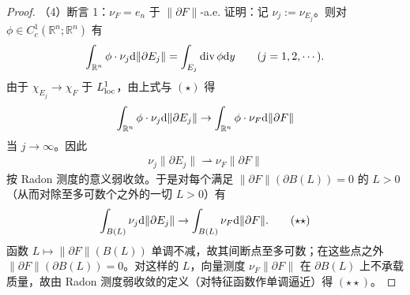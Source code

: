 \documentclass[../../main.tex]{subfiles}%
\begin{document}
\begin{proof}
（4）断言 1：$\nu_F=e_n$ 于 $\lVert\partial F\rVert$-a.e.
证明：记 $\nu_j:=\nu_{E_j}$。则对 $\phi\in C_c^1(\mathbb{R}^n;\mathbb{R}^n)$ 有
\begin{align*}
\int_{\mathbb{R}^n}\phi\cdot\nu_j\mathrm{d}\lVert\partial E_j\rVert=\int_{E_j}\operatorname{div}\phi\mathrm{d} y\qquad(j=1,2,\cdots).
\end{align*}
由于 $\chi_{E_j}\to\chi_F$ 于 $L^1_{\mathrm{loc}}$，由上式与 $(\star)$ 得
\begin{align*}
\int_{\mathbb{R}^n}\phi\cdot\nu_j\mathrm{d}\lVert\partial E_j\rVert\to\int_{\mathbb{R}^n}\phi\cdot\nu_F\mathrm{d}\lVert\partial F\rVert
\end{align*}
当 $j\to\infty$。因此
\begin{align*}
\nu_j\lVert\partial E_j\rVert\rightharpoonup\nu_F\lVert\partial F\rVert
\end{align*}
按 Radon 测度的意义弱收敛。于是对每个满足 $\lVert\partial F\rVert(\partial B(L))=0$ 的 $L>0$（从而对除至多可数个之外的一切 $L>0$）有
\begin{align*}
\int_{B(L)}\nu_j\mathrm{d}\lVert\partial E_j\rVert\to\int_{B(L)}\nu_F\mathrm{d}\lVert\partial F\rVert .\qquad(\star\star)
\end{align*}
函数 $L\mapsto\lVert\partial F\rVert(B(L))$ 单调不减，故其间断点至多可数；在这些点之外 $\lVert\partial F\rVert(\partial B(L))=0$。对这样的 $L$，向量测度 $\nu_F\lVert\partial F\rVert$ 在 $\partial B(L)$ 上不承载质量，故由 Radon 测度弱收敛的定义（对特征函数作单调逼近）得 $(\star\star)$。


\end{proof}
\end{document}
